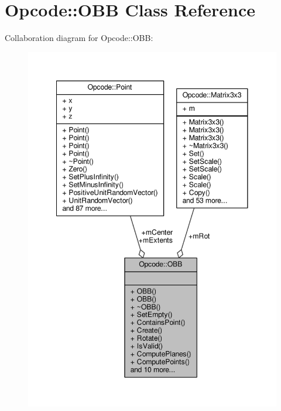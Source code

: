 \hypertarget{classOpcode_1_1OBB}{}\section{Opcode\+:\+:O\+BB Class Reference}
\label{classOpcode_1_1OBB}


Collaboration diagram for Opcode\+:\+:O\+BB\+:
\nopagebreak
\begin{figure}[H]
\begin{center}
\leavevmode
\includegraphics[width=348pt]{dd/de2/classOpcode_1_1OBB__coll__graph}
\end{center}
\end{figure}
